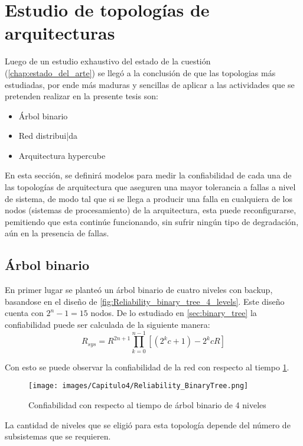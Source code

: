 \section{Estudio de topologías de arquitecturas}\label{seccion:TopologiaEstudio}
Luego de un estudio exhaustivo del estado de la cuestión (\autoref{chap:estado_del_arte}) se llegó a la conclusión de que las topologias más estudiadas, por ende más maduras y sencillas de aplicar a las actividades que se pretenden realizar en la presente tesis son:
\begin{itemize}
  \item Árbol binario
  \item Red distribui|da
  \item Arquitectura hypercube
\end{itemize}

En esta sección, se definirá modelos para medir la confiabilidad de cada una de las topologías de arquitectura que aseguren una mayor tolerancia a fallas a nivel de sistema, de modo tal que si se llega a producir una falla en cualquiera de los nodos (sistemas de procesamiento) de la arquitectura, esta puede reconfigurarse, pemitiendo que esta continúe funcionando, sin sufrir ningún tipo de degradación, aún en la presencia de fallas.

\subsection{Árbol binario}
En primer lugar se planteó un árbol binario de cuatro niveles con backup, basandose en el diseño de \cite{Raghavendra84} \ref{fig:Reliability_binary_tree_4_levels}. Este diseño cuenta con $2^n - 1 =  15$ nodos. De lo estudiado en \autoref{sec:binary_tree} la confiabilidad puede ser calculada de la siguiente manera: $$R_{sys} = R^{2n +1} \prod_{k=0}^{n-1}{[(2^kc+1) - 2^kcR]}$$

Con esto se puede observar la confiabilidad de la red con respecto al tiempo \ref{fig:Reliability_binary_tree_4_levels_2}.

\begin{figure}[H]
 \centering
 \texttt{[image: images/Capitulo4/Reliability\_BinaryTree.png]}
  \caption{Confiabilidad con respecto al tiempo de árbol binario de 4 niveles}
\label{fig:Reliability_binary_tree_4_levels_2}
\end{figure}

La cantidad de niveles que se eligió para esta topología depende del número de subsistemas que se requieren.

